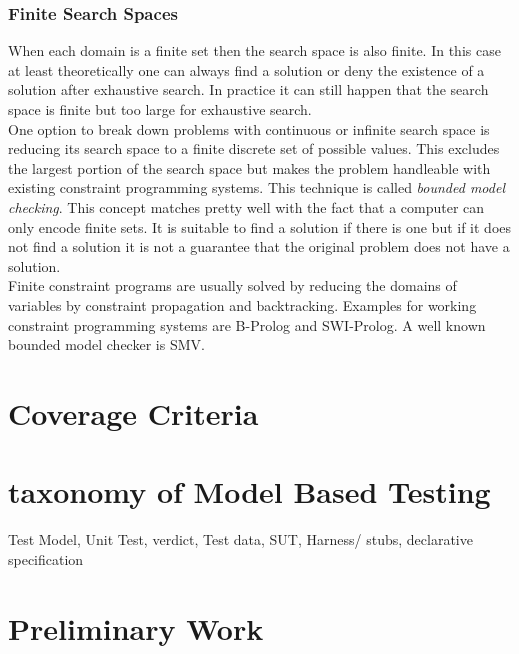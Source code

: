 \subsubsection{Finite Search Spaces}
When each domain is a finite set then the search space is also finite. In this case at least theoretically one can always find a solution or deny the existence of a solution after exhaustive search. In practice it can still happen that the search space is finite but too large for exhaustive search.\\
One option to break down problems with continuous or infinite search space is reducing its search space to a finite discrete set of possible values. This excludes the largest portion of the search space but makes the problem handleable with existing constraint programming systems. This technique is called \emph{bounded model checking}. This concept matches pretty well with the fact that a computer can only encode finite sets. It is suitable to find a solution if there is one but if it does not find a solution it is not a guarantee that the original problem does not have a solution.\\
Finite constraint programs are usually solved by reducing the domains of variables by constraint propagation and backtracking. Examples for working constraint programming systems are B-Prolog and SWI-Prolog\cite{citation needed}. A well known bounded model checker is SMV\cite{citation needed}. 




\section{Coverage Criteria}
\section{taxonomy of Model Based Testing}
Test Model,
Unit Test,
verdict,
Test data,
SUT,
Harness/ stubs,
declarative specification

\section{Preliminary Work}
